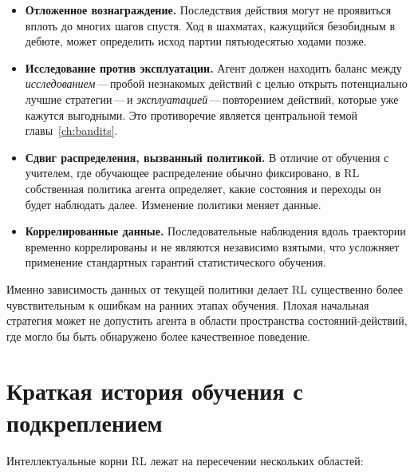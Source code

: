 \begin{itemize}[leftmargin=*]
\item \textbf{Отложенное вознаграждение.}
Последствия действия могут не проявиться вплоть до многих шагов спустя.  Ход в шахматах, кажущийся безобидным в дебюте, может определить исход партии пятьюдесятью ходами позже.

\item \textbf{Исследование против эксплуатации.}
Агент должен находить баланс между \emph{исследованием}\,---\,пробой незнакомых действий с целью открыть потенциально лучшие стратегии\,---\,и \emph{эксплуатацией}\,---\,повторением действий, которые уже кажутся выгодными.  Это противоречие является центральной темой главы~\ref{ch:bandits}.

\item \textbf{Сдвиг распределения, вызванный политикой.}
В отличие от обучения с учителем, где обучающее распределение обычно фиксировано, в RL собственная политика агента определяет, какие состояния и переходы он будет наблюдать далее.  Изменение политики меняет данные.

\item \textbf{Коррелированные данные.}
Последовательные наблюдения вдоль траектории временно коррелированы и не являются независимо взятыми, что усложняет применение стандартных гарантий статистического обучения.
\end{itemize}

\begin{remark}
Именно зависимость данных от текущей политики делает RL существенно более чувствительным к ошибкам на ранних этапах обучения.  Плохая начальная стратегия может не допустить агента в области пространства состояний-действий, где могло бы быть обнаружено более качественное поведение.
\end{remark}


\section{Краткая история обучения с подкреплением}
\label{sec:history}

Интеллектуальные корни RL лежат на пересечении нескольких областей:

